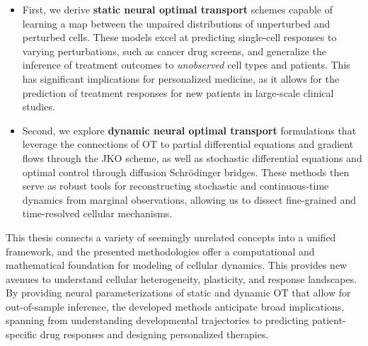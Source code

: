 \begin{itemize}[leftmargin=*]
	\item First, we derive \textbf{static neural optimal transport} schemes capable of learning a map between the unpaired distributions of unperturbed and perturbed cells. These models excel at predicting single-cell responses to varying perturbations, such as cancer drug screens, and generalize the inference of treatment outcomes to \emph{unobserved} cell types and patients.
This has significant implications for personalized medicine, as it allows for the prediction of treatment responses for new patients in large-scale clinical studies.

	\item Second, we explore \textbf{dynamic neural optimal transport} formulations that leverage the connections of OT to partial differential equations and gradient flows through the \acrfull{JKO} scheme, as well as stochastic differential equations and optimal control through diffusion Schr{\"o}dinger bridges. These methods then serve as robust tools for reconstructing stochastic and continuous-time dynamics from marginal observations, allowing us to dissect fine-grained and time-resolved cellular mechanisms.
\end{itemize}

This thesis connects a variety of seemingly unrelated concepts into a unified framework, and the presented methodologies offer a computational and mathematical foundation for modeling of cellular dynamics. This provides new avenues to understand cellular heterogeneity, plasticity, and response landscapes.
By providing neural parameterizations of static and dynamic OT that allow for out-of-sample inference, the developed methods anticipate broad implications, spanning from understanding developmental trajectories to predicting patient-specific drug responses and designing personalized therapies.


\endgroup

